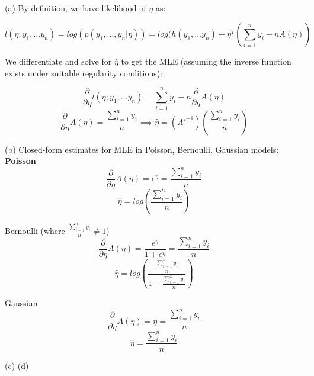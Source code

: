 \documentclass[11pt]{article}
\newenvironment{problem}[2][Problem]{\begin{trivlist}
\item[\hskip \labelsep {\bfseries #1}\hskip \labelsep {\bfseries #2.}]}{\end{trivlist}}
\begin{document}
\begin{problem}{2.3}
\text{ }\\

(a) By definition, we have likelihood of $\eta$ as:

\[l(\eta; y_1,...y_n) = log(p(y_1,...,y_n|\eta)) = log(h(y_1,...y_n) + \eta^T(\sum^{n}_{i=1}y_i-nA(\eta))\]

\begin{adjustwidth}{2.5em}{0pt}
We differentiate and solve for $\hat{\eta}$ to get the MLE (assuming the inverse function exists under suitable regularity conditions):
\end{adjustwidth}

\[\frac{\partial}{\partial\eta}l(\eta; y_1,...y_n) = \sum^{n}_{i=1}y_i-n\frac{\partial}{\partial\eta}A(\eta)\]
\[\frac{\partial}{\partial\eta}A(\eta) = \frac{\sum^{n}_{i=1}y_i}{n} \implies \hat{\eta} = (A'^{-1})(\frac{\sum^{n}_{i=1}y_i}{n})\]

(b) Closed-form estimates for MLE in Poisson, Bernoulli, Gaussian models:
\\

\bf{Poisson}
\[\frac{\partial}{\partial\eta}A(\eta) = e^{\eta} = \frac{\sum^{n}_{i=1}y_i}{n}\]
\[\hat{\eta} = log(\frac{\sum^{n}_{i=1}y_i}{n}) \]

Bernoulli (where $\frac{\sum^{n}_{i=1}y_i}{n} \neq 1$)
\[\frac{\partial}{\partial\eta}A(\eta) = \frac{e^{\eta}}{1+e^{\eta}} = \frac{\sum^{n}_{i=1}y_i}{n}\]
\[\hat{\eta} = log(\frac{\frac{\sum^{n}_{i=1}y_i}{n}}{1-\frac{\sum^{n}_{i=1}y_i}{n}})\]

Gaussian
\[\frac{\partial}{\partial\eta}A(\eta) = \eta = \frac{\sum^{n}_{i=1}y_i}{n} \]
\[\hat{\eta} = \frac{\sum^{n}_{i=1}y_i}{n}\]

{\color{red} (c) (d)}
\end{problem}
\end{document}
